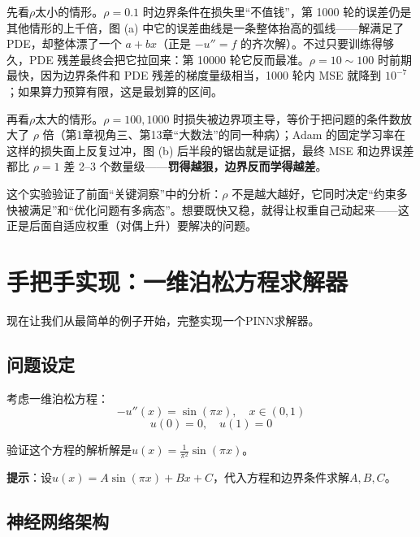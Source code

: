 先看$\rho$太小的情形。$\rho = 0.1$ 时边界条件在损失里“不值钱”，第 1000 轮的误差仍是其他情形的上千倍，图 (a) 中它的误差曲线是一条整体抬高的弧线——解满足了 PDE，却整体漂了一个 $a + bx$（正是 $-u'' = f$ 的齐次解）。不过只要训练得够久，PDE 残差最终会把它拉回来：第 10000 轮它反而最准。$\rho = 10 \sim 100$ 时前期最快，因为边界条件和 PDE 残差的梯度量级相当，1000 轮内 MSE 就降到 $10^{-7}$；如果算力预算有限，这是最划算的区间。

再看$\rho$太大的情形。$\rho = 100, 1000$ 时损失被边界项主导，等价于把问题的条件数放大了 $\rho$ 倍（第1章视角三、第13章“大数法”的同一种病）；Adam 的固定学习率在这样的损失面上反复过冲，图 (b) 后半段的锯齿就是证据，最终 MSE 和边界误差都比 $\rho = 1$ 差 2--3 个数量级——\textbf{罚得越狠，边界反而学得越差}。

这个实验验证了前面“关键洞察”中的分析：$\rho$ 不是越大越好，它同时决定“约束多快被满足”和“优化问题有多病态”。想要既快又稳，就得让权重自己动起来——这正是后面自适应权重（对偶上升）要解决的问题。

\section{手把手实现：一维泊松方程求解器}

现在让我们从最简单的例子开始，完整实现一个PINN求解器。

\subsection{问题设定}

考虑一维泊松方程：
\begin{equation}
    -u''(x) = \sin(\pi x), \quad x \in (0, 1)
\end{equation}
\begin{equation}
    u(0) = 0, \quad u(1) = 0
\end{equation}

\begin{exercise}[title = 解析解推导]
验证这个方程的解析解是$u(x) = \frac{1}{\pi^2}\sin(\pi x)$。

\textbf{提示}：设$u(x) = A\sin(\pi x) + Bx + C$，代入方程和边界条件求解$A, B, C$。
\end{exercise}

\subsection{神经网络架构}

